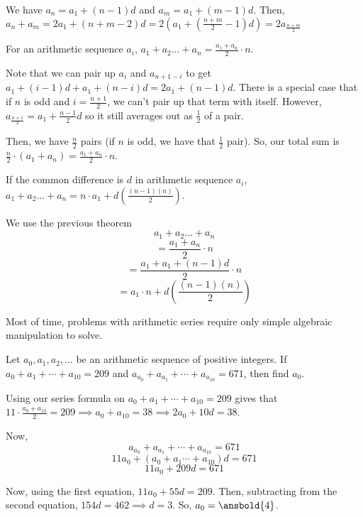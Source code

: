 \documentclass[11pt][mast]{lucky}
\begin{document}
\begin{pro}
We have $a_{n}=a_{1}+(n-1)d$ and $a_{m}=a_{1}+(m-1)d$. Then, $a_{n}+a_{m}=2a_{1}+(n+m-2)d=2(a_{1}+(\frac{n+m}{2}-1)d)=2a_{\frac{n+m}{2}}$
\end{pro}

\begin{theo}
For an arithmetic sequence $a_{i}$, $a_{1}+a_{2}\ldots + a_{n}=\frac{a_{1}+a_{n}}{2}\cdot n$.
\end{theo}

\begin{pro}
Note that we can pair up $a_{i}$ and $a_{n+1-i}$ to get $a_{1}+(i-1)d+a_{1}+(n-i)d=2a_{1}+(n-1)d$. There is a special case that if $n$ is odd and $i=\frac{n+1}{2}$, we can't pair up that term with itself. However, $a_{\frac{n+1}{2}}=a_{1}+\frac{n-1}{2}d$ so it still averages out as $\frac{1}{2}$ of a pair.

Then, we have $\frac{n}{2}$ pairs (if $n$ is odd, we have that $\frac{1}{2}$ pair). So, our total sum is
$\frac{n}{2}\cdot (a_{1}+a_{n})=\frac{a_{1}+a_{n}}{2}\cdot n$.
\end{pro}

\begin{theo}
If the common difference is $d$ in arithmetic sequence $a_{i}$, $a_{1}+a_{2}\ldots + a_{n}=n\cdot a_{1}+d(\frac{(n-1)(n)}{2})$.
\end{theo}

\begin{pro}
We use the previous theorem
$$a_{1}+a_{2}\ldots + a_{n}$$
$$=\frac{a_{1}+a_{n}}{2}\cdot n$$
$$=\frac{a_{1}+a_{1}+(n-1)d}{2}\cdot n$$
$$=a_{1}\cdot n + d(\frac{(n-1)(n)}{2})$$
\end{pro}

Most of time, problems with arithmetic series require only simple algebraic manipulation to solve.

\begin{exam}
Let $a_0, a_1, a_2, \ldots$ be an arithmetic sequence of positive integers. If $a_0 + a_1 + \cdots + a_{10} = 209$ and $a_{a_{0}} +
a_{a_{1}} + \cdots + a_{a_{10}} = 671$, then find $a_0$.
\end{exam}

\begin{sol}
Using our series formula on $a_0 + a_1 + \cdots + a_{10} = 209$ gives that $11\cdot \frac{a_{0}+a_{10}}{2}=209\implies a_{0}+a_{10}=38\implies 2a_{0}+10d=38$.

Now,
$$a_{a_{0}}+a_{a_{1}} + \cdots + a_{a_{10}} = 671$$
$$11a_{0}+(a_{0}+a_{1}\cdots + a_{10})d=671$$
$$11a_{0}+209d=671$$

Now, using the first equation, $11a_{0}+55d=209$. Then, subtracting from the second equation, $154d=462\implies d =3$. So, $a_{0}=\ansbold{4}$.
\end{sol}
\end{document}
